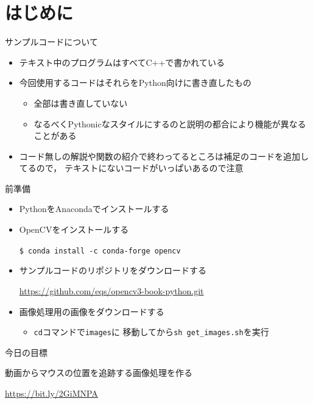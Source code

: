 \documentclass[10pt]{beamer}
\newcommand{\mymain}[1]{\textcolor{mLightBrown}{#1}}
\begin{document}
	\section{はじめに}

	\begin{frame}{サンプルコードについて}
		\begin{itemize}
			\item テキスト中のプログラムはすべてC++で書かれている
			\item 今回使用するコードはそれらをPython向けに書き直したもの
				\begin{itemize}
					\item 全部は書き直していない \Winkey[1.5]
					\item なるべくPythonicなスタイルにするのと説明の都合により機能が異なることがある
				\end{itemize}
            \item コード無しの解説や関数の紹介で終わってるところは補足のコードを追加してるので，
                テキストにないコードがいっぱいあるので注意
		\end{itemize}
	\end{frame}
	
	\begin{frame}[fragile]{前準備}
		\begin{itemize}
		    \item PythonをAnacondaでインストールする
		    \item OpenCVをインストールする
		        \begin{center}
		            \texttt{\$ conda install -c conda-forge opencv}
		        \end{center}
			\item サンプルコードのリポジトリをダウンロードする
				\begin{center}
					\url{https://github.com/eqs/opencv3-book-python.git}
				\end{center}
			\item 画像処理用の画像をダウンロードする
				\begin{itemize}
					\item \mymain{\texttt{cd}}コマンドで\mymain{\texttt{images}}に
						移動してから\mymain{\texttt{sh get\_images.sh}}を実行
				\end{itemize}
		\end{itemize}
	\end{frame}
	
	\begin{frame}{今日の目標}
	    \begin{center}
    	    動画からマウスの位置を追跡する画像処理を作る
    	    
	        \url{https://bit.ly/2GiMNPA}
	    \end{center}
	\end{frame}
	
\end{document}
